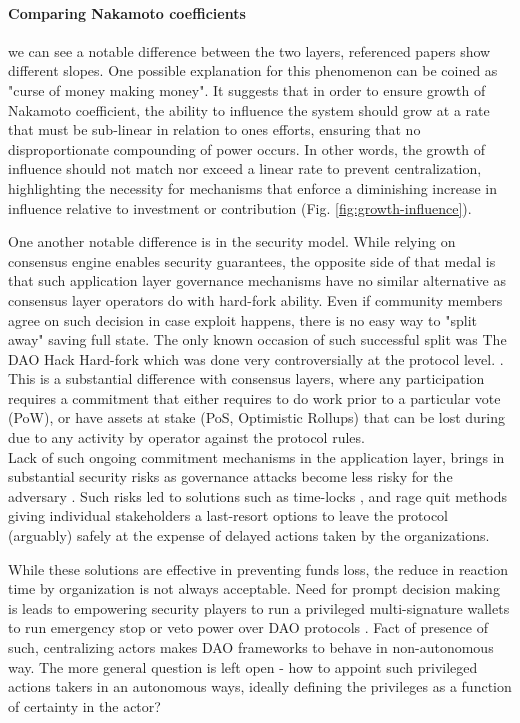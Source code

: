 \documentclass{article}
\begin{document}
\begin{CJK}{UTF8}{gbsn}
\begin{multicols}{2}
        \paragraph*{Comparing  Nakamoto coefficients} we can see a notable difference between the two layers, referenced papers show different slopes. One possible explanation for this phenomenon can be coined as "curse of money making money". It suggests that in order to ensure growth of Nakamoto coefficient, the ability to influence the system should grow at a rate that must be sub-linear in relation to ones efforts, ensuring that no disproportionate compounding of power occurs. In other words, the growth of influence should not match nor exceed a linear rate to prevent centralization, highlighting the necessity for mechanisms that enforce a diminishing increase in influence relative to investment or contribution (Fig. \ref*{fig:growth-influence}).

        One another notable difference is in the security model. While relying on consensus engine enables security guarantees, the opposite side of that medal is that such application layer governance mechanisms have no similar alternative as consensus layer operators do with hard-fork ability. Even if community members agree on such decision in case exploit happens, there is no easy way to "split away" saving full state. The only known occasion of such successful split was The DAO Hack Hard-fork which was done very controversially at the protocol level.  \cite{Liu2021}.
        This is a substantial difference with consensus layers, where any participation requires a commitment that either requires to do work prior to a particular vote (PoW), or have assets at stake (PoS, Optimistic Rollups) that can be lost during due to any activity by operator against the protocol rules.\\
        Lack of such ongoing commitment mechanisms in the application layer, brings in substantial security risks as governance attacks become less risky for the adversary \cite{AragonBlog}\cite{rhizoo2023}. Such risks led to solutions such as time-locks \cite{Jack2021}, and rage quit \cite{Ameen2019} methods giving individual stakeholders a last-resort options to leave the protocol (arguably) safely at the expense of delayed actions taken by the organizations.

        While these solutions are effective in preventing funds loss, the reduce in reaction time by organization is not always acceptable. Need for prompt decision making is leads to empowering security players to run a privileged multi-signature wallets to run emergency stop or veto power over DAO protocols \cite{Jason2024}. Fact of presence of such, centralizing actors makes DAO frameworks to behave in non-autonomous way. The more general question is left open - how to appoint such privileged actions takers in an autonomous ways, ideally defining the privileges as a function of certainty in the actor?


\end{multicols}
\end{CJK}
\end{document}

